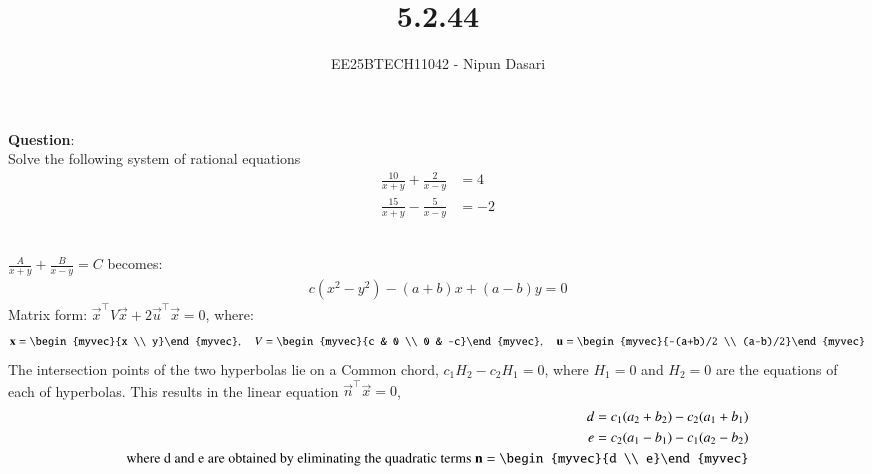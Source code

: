\documentclass[journal]{IEEEtran}
\begin{document}
	
	
	\vspace{3cm}
	
	\title{5.2.44}
	\author{EE25BTECH11042 - Nipun Dasari}
	\maketitle
	
	\renewcommand{\thefigure}{\theenumi}
	\renewcommand{\thetable}{\theenumi}
	\setlength{\intextsep}{10pt}
	
	\renewcommand{\thetable}{\theenumi}
	
	\textbf{Question}:\\
	Solve the following system of rational equations
	\begin{align}
		\frac{10}{x+y}+\frac{2}{x-y} &= 4 \\
		\frac{15}{x+y}-\frac{5}{x-y} &= -2
	\end{align}
	
	\solution \\
	 $\frac{A}{x+y} + \frac{B}{x-y} = C$ becomes:
	\begin{align}
		c(x^2 - y^2) - (a+b)x + (a-b)y = 0 \label{eq:hyperbola_form}
	\end{align}
	Matrix form: $\vec{x}^\top V \vec{x} + 2\vec{u}^\top \vec{x} = 0$, where:
	\begin{align}
		\vec{x} = \begin{myvec}{x \\ y}\end{myvec}, \quad
		V = \begin{myvec}{c & 0 \\ 0 & -c}\end{myvec}, \quad
		\vec{u} = \begin{myvec}{-(a+b)/2 \\ (a-b)/2}\end{myvec} \label{eq:matrix_defs}
	\end{align}
	The intersection points of the two hyperbolas lie on a Common chord, $c_1H_2-c_2H_1=0$, where $H_1=0$ and $H_2=0$ are the equations of each of hyperbolas. This results in the linear equation $\vec{n}^\top\vec{x}=0$,
	\begin{align}
		d = c_1(a_2+b_2) - c_2(a_1+b_1) \label{eq:D_coeff} \\
		e = c_2(a_1-b_1) - c_1(a_2-b_2) \label{eq:E_coeff} \\
		\text{where d and e are obtained by eliminating the quadratic terms  } \vec{n} = \begin{myvec}{d \\ e}\end{myvec}
	\end{align}
	
\end{document}
